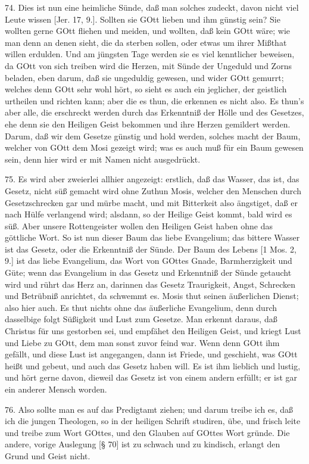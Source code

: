 74. Dies ist nun eine heimliche Sünde, daß man solches zudeckt, davon nicht viel Leute wissen [Jer. 17, 9.]. Sollten sie GOtt lieben und ihm günstig sein? Sie wollten gerne GOtt fliehen und meiden, und wollten, daß kein GOtt wäre; wie man denn an denen sieht, die da sterben sollen, oder etwas um ihrer Mißthat willen erdulden. Und am jüngsten Tage werden sie es viel kenntlicher beweisen, da GOtt von sich treiben wird die Herzen, mit Sünde der Ungeduld und Zorns beladen, eben darum, daß sie ungeduldig gewesen, und wider GOtt gemurrt; welches denn GOtt sehr wohl hört, so sieht es auch ein jeglicher, der geistlich urtheilen und richten kann; aber die es thun, die erkennen es nicht also. Es thun's aber alle, die erschreckt werden durch das Erkenntniß der Hölle und des Gesetzes, ehe denn sie den Heiligen Geist bekommen und ihre Herzen gemildert werden. Darum, daß wir dem Gesetze günstig und hold werden, solches macht der Baum, welcher von GOtt dem Mosi gezeigt wird; was es auch muß für ein Baum gewesen sein, denn hier wird er mit Namen nicht ausgedrückt.

75. Es wird aber zweierlei allhier angezeigt: erstlich, daß das Wasser, das ist, das Gesetz, nicht süß gemacht wird ohne Zuthun Mosis, welcher den Menschen durch Gesetzschrecken gar und mürbe macht, und mit Bitterkeit also ängstiget, daß er nach Hülfe verlangend wird; alsdann, so der Heilige Geist kommt, bald wird es süß. Aber unsere Rottengeister wollen den Heiligen Geist haben ohne das göttliche Wort. So ist nun dieser Baum das liebe Evangelium; das bittere Wasser ist das Gesetz, oder die Erkenntniß der Sünde. Der Baum des Lebens [1 Mos. 2, 9.] ist das liebe Evangelium, das Wort von GOttes Gnade, Barmherzigkeit und Güte; wenn das Evangelium in das Gesetz und Erkenntniß der Sünde getaucht wird und rührt das Herz an, darinnen das Gesetz Traurigkeit, Angst, Schrecken und Betrübniß anrichtet, da schwemmt es. Mosis thut seinen äußerlichen Dienst; also hier auch. Es thut nichts ohne das äußerliche Evangelium, denn durch dasselbige folgt Süßigkeit und Lust zum Gesetze. Man erkennt daraus, daß Christus für uns gestorben sei, und empfähet den Heiligen Geist, und kriegt Lust und Liebe zu GOtt, dem man sonst zuvor feind war. Wenn denn GOtt ihm gefällt, und diese Lust ist angegangen, dann ist Friede, und geschieht, was GOtt heißt und gebeut, und auch das Gesetz haben will. Es ist ihm lieblich und lustig, und hört gerne davon, dieweil das Gesetz ist von einem andern erfüllt; er ist gar ein anderer Mensch worden.

76. Also sollte man es auf das Predigtamt ziehen; und darum treibe ich es, daß ich die jungen Theologen, so in der heiligen Schrift studiren, übe, und frisch leite und treibe zum Wort GOttes, und den Glauben auf GOttes Wort gründe. Die andere, vorige Auslegung [§ 70] ist zu schwach und zu kindisch, erlangt den Grund und Geist nicht.

